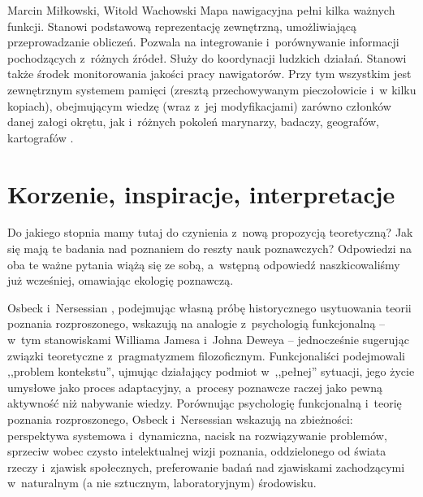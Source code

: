 \begin{artplenv2auth}{Marcin Miłkowski, Witold Wachowski}
Mapa nawigacyjna pełni kilka ważnych funkcji. Stanowi podstawową reprezentację zewnętrzną, umożliwiającą przeprowadzanie obliczeń. Pozwala na integrowanie i~porównywanie informacji pochodzących z~różnych źródeł. Służy do koordynacji ludzkich działań. Stanowi także środek monitorowania jakości pracy nawigatorów. Przy tym wszystkim jest zewnętrznym systemem pamięci (zresztą przechowywanym pieczołowicie i~w kilku kopiach), obejmującym wiedzę (wraz z~jej modyfikacjami) zarówno członków danej załogi okrętu, jak i~różnych pokoleń marynarzy, badaczy, geografów, kartografów
\parencites[][s.~93–98]{afeltowicz_how_2015}[][s.~61–143]{hutchins_cognition_1995}.%


\section{Korzenie, inspiracje, interpretacje}

Do jakiego stopnia mamy tutaj do czynienia z~nową propozycją teoretyczną? Jak się mają te badania nad poznaniem do reszty nauk poznawczych? Odpowiedzi na oba te ważne pytania wiążą się ze sobą, a~wstępną odpowiedź naszkicowaliśmy już wcześniej, omawiając ekologię poznawczą.

Osbeck i~Nersessian
\parencite*[][]{osbeck_situating_2014}, %
 podejmując własną próbę historycznego usytuowania teorii poznania rozproszonego, wskazują na analogie z~psychologią funkcjonalną -- w~tym stanowiskami Williama Jamesa i~Johna Deweya -- jednocześnie sugerując związki teoretyczne z~pragmatyzmem filozoficznym. Funkcjonaliści podejmowali ,,problem kontekstu'', ujmując działający podmiot w~,,pełnej'' sytuacji, jego życie umysłowe jako proces adaptacyjny, a~procesy poznawcze raczej jako pewną aktywność niż nabywanie wiedzy. Porównując psychologię funkcjonalną i~teorię poznania rozproszonego, Osbeck i~Nersessian wskazują na zbieżności: perspektywa systemowa i~dynamiczna, nacisk na rozwiązywanie problemów, sprzeciw wobec czysto intelektualnej wizji poznania, oddzielonego od świata rzeczy i~zjawisk społecznych, preferowanie badań nad zjawiskami zachodzącymi w~naturalnym (a nie sztucznym, laboratoryjnym) środowisku.


\end{artplenv2auth}
